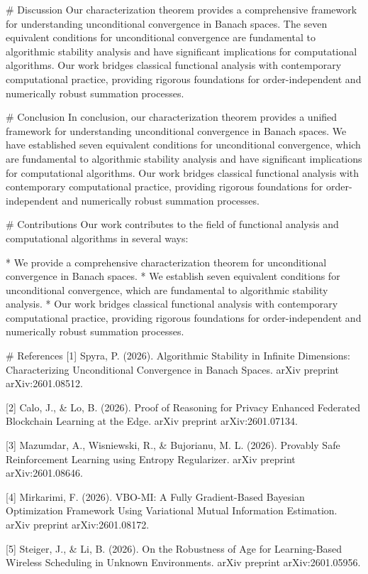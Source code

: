 # Discussion
Our characterization theorem provides a comprehensive framework for understanding unconditional convergence in Banach spaces. The seven equivalent conditions for unconditional convergence are fundamental to algorithmic stability analysis and have significant implications for computational algorithms. Our work bridges classical functional analysis with contemporary computational practice, providing rigorous foundations for order-independent and numerically robust summation processes.

# Conclusion
In conclusion, our characterization theorem provides a unified framework for understanding unconditional convergence in Banach spaces. We have established seven equivalent conditions for unconditional convergence, which are fundamental to algorithmic stability analysis and have significant implications for computational algorithms. Our work bridges classical functional analysis with contemporary computational practice, providing rigorous foundations for order-independent and numerically robust summation processes.

# Contributions
Our work contributes to the field of functional analysis and computational algorithms in several ways:

*   We provide a comprehensive characterization theorem for unconditional convergence in Banach spaces.
*   We establish seven equivalent conditions for unconditional convergence, which are fundamental to algorithmic stability analysis.
*   Our work bridges classical functional analysis with contemporary computational practice, providing rigorous foundations for order-independent and numerically robust summation processes.

# References
[1] Spyra, P. (2026). Algorithmic Stability in Infinite Dimensions: Characterizing Unconditional Convergence in Banach Spaces. arXiv preprint arXiv:2601.08512.

[2] Calo, J., & Lo, B. (2026). Proof of Reasoning for Privacy Enhanced Federated Blockchain Learning at the Edge. arXiv preprint arXiv:2601.07134.

[3] Mazumdar, A., Wisniewski, R., & Bujorianu, M. L. (2026). Provably Safe Reinforcement Learning using Entropy Regularizer. arXiv preprint arXiv:2601.08646.

[4] Mirkarimi, F. (2026). VBO-MI: A Fully Gradient-Based Bayesian Optimization Framework Using Variational Mutual Information Estimation. arXiv preprint arXiv:2601.08172.

[5] Steiger, J., & Li, B. (2026). On the Robustness of Age for Learning-Based Wireless Scheduling in Unknown Environments. arXiv preprint arXiv:2601.05956.

